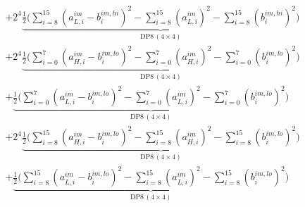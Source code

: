 \documentclass[fleqn]{article}
\newcommand{\DPop}[3]{\mathrm{DP#1}\,(#2\!\times\!#3)}
\begin{document}
\begin{align*}
  & + 2^{4}\underbrace{\tfrac{1}{2}\Big(\sum_{i=8}^{15}(a_{L,i}^{im}{-}b_i^{im,hi})^2 - \sum_{i=8}^{15}(a_{L,i}^{im})^2 - \sum_{i=8}^{15}(b_i^{im,hi})^2\Big)}_{\DPop{8}{4}{4}} \\[0.7em]
  & + 2^{4}\underbrace{\tfrac{1}{2}\Big(\sum_{i=0}^{7}(a_{H,i}^{im}{-}b_i^{im,lo})^2 - \sum_{i=0}^{7}(a_{H,i}^{im})^2 - \sum_{i=0}^{7}(b_i^{im,lo})^2\Big)}_{\DPop{8}{4}{4}} \\[0.7em]
  & + \underbrace{\tfrac{1}{2}\Big(\sum_{i=0}^{7}(a_{L,i}^{im}{-}b_i^{im,lo})^2 - \sum_{i=0}^{7}(a_{L,i}^{im})^2 - \sum_{i=0}^{7}(b_i^{im,lo})^2\Big)}_{\DPop{8}{4}{4}} \\[0.7em]
  & + 2^{4}\underbrace{\tfrac{1}{2}\Big(\sum_{i=8}^{15}(a_{H,i}^{im}{-}b_i^{im,lo})^2 - \sum_{i=8}^{15}(a_{H,i}^{im})^2 - \sum_{i=8}^{15}(b_i^{im,lo})^2\Big)}_{\DPop{8}{4}{4}} \\[0.7em]
  & + \underbrace{\tfrac{1}{2}\Big(\sum_{i=8}^{15}(a_{L,i}^{im}{-}b_i^{im,lo})^2 - \sum_{i=8}^{15}(a_{L,i}^{im})^2 - \sum_{i=8}^{15}(b_i^{im,lo})^2\Big)}_{\DPop{8}{4}{4}}
\end{align*}
\end{document}
